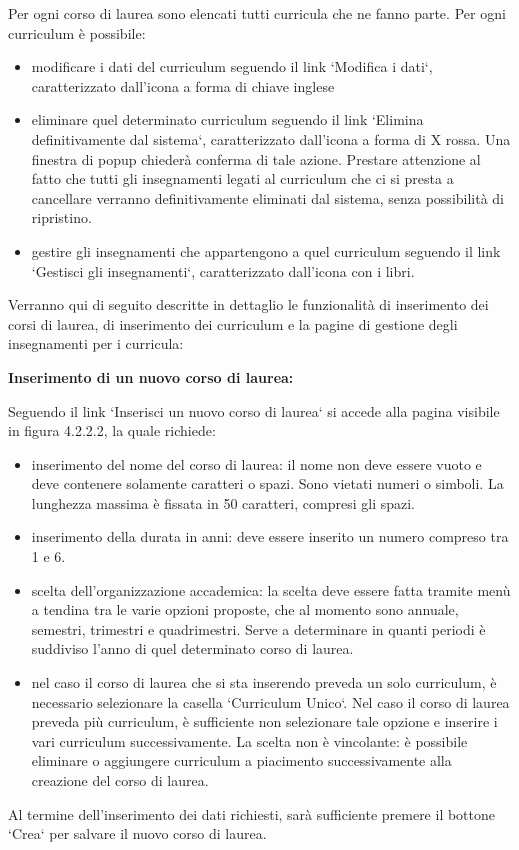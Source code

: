 \documentclass[11pt,a4paper]{article}
\begin{document}
Per ogni corso di laurea sono elencati tutti curricula che ne fanno parte.
Per ogni curriculum è possibile:
\begin{itemize}
 \item modificare i dati del curriculum seguendo il link `Modifica i dati`, caratterizzato dall'icona a forma di chiave inglese
 \item eliminare quel determinato curriculum seguendo il link `Elimina definitivamente dal sistema`, caratterizzato dall'icona a forma di X rossa. Una finestra di popup chiederà conferma di tale azione. Prestare attenzione al fatto che tutti gli insegnamenti legati al curriculum che ci si presta a cancellare verranno definitivamente eliminati dal sistema, senza possibilità di ripristino.
 \item gestire gli insegnamenti che appartengono a quel curriculum seguendo il link `Gestisci gli insegnamenti`, caratterizzato dall'icona con i libri.
\end{itemize}

Verranno qui di seguito descritte in dettaglio le funzionalità di inserimento dei corsi di laurea, di inserimento dei curriculum e la pagine di gestione degli insegnamenti per i curricula:
\newline \newline \newline
\begin{large}\textbf{Inserimento di un nuovo corso di laurea:}\end{large}
\newline \newline
Seguendo il link `Inserisci un nuovo corso di laurea` si accede alla pagina visibile in figura 4.2.2.2, la quale richiede:
\begin{itemize}
 \item inserimento del nome del corso di laurea: il nome non deve essere vuoto e deve contenere solamente caratteri o spazi. Sono vietati numeri o simboli. La lunghezza massima è fissata in 50 caratteri, compresi gli spazi.
 \item inserimento della durata in anni: deve essere inserito un numero compreso tra 1 e 6.
 \item scelta dell'organizzazione accademica: la scelta deve essere fatta tramite menù a tendina tra le varie opzioni proposte, che al momento sono annuale, semestri, trimestri e quadrimestri. Serve a determinare in quanti periodi è suddiviso l'anno di quel determinato corso di laurea.
 \item nel caso il corso di laurea che si sta inserendo preveda un solo curriculum, è necessario selezionare la casella `Curriculum Unico`. Nel caso il corso di laurea preveda più curriculum, è sufficiente non selezionare tale opzione e inserire i vari curriculum successivamente. La scelta non è vincolante: è possibile eliminare o aggiungere curriculum a piacimento successivamente alla creazione del corso di laurea.
\end{itemize}
Al termine dell'inserimento dei dati richiesti, sarà sufficiente premere il bottone `Crea` per salvare il nuovo corso di laurea.
\end{document}
